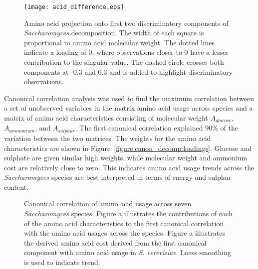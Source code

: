 \begin{figure}
  \centering
  \texttt{[image: acid\_difference.eps]}
  \caption[Amino acid projection onto first two discriminatory components of \emph{Saccharomyces} decomposition]{Amino acid projection onto first two discriminatory components of \emph{Saccharomyces} decomposition. The width of each square is proportional to amino acid molecular weight. The dotted lines indicate a loading of 0, where observations closer to 0 have a lesser contribution to the singular value. The dashed circle crosses both components at -0.3 and 0.3 and is added to highlight discriminatory observations.}
  \label{figure:acid_decomp}
\end{figure}

Canonical correlation analysis was used to find the maximum correlation between a set of unobserved variables in the matrix amino acid usage across species and a matrix of amino acid characteristics consisting of molecular weight $A_{glucose}$, $A_{ammonium}$, and $A_{sulphur}$. The first canonical correlation explained 90\% of the variation between the two matrices. The weights for the amino acid characteristics are shown in Figure~\vref{figure:canon_decomp:loadings}. Glucose and sulphate are given similar high weights, while molecular weight and ammonium cost are relatively close to zero. This indicates amino acid usage trends across the \emph{Saccharomyces} species are best interpreted in terms of energy and sulphur content.


\begin{figure}
  \centering
  \vfill
  \caption[Canonical correlation of amino acid usage]{Canonical correlation of amino acid usage across seven \emph{Saccharomyces} species. Figure a illustrates the contributions of each of the amino acid characteristics to the first canonical correlation with the amino acid usages across the species. Figure a illustrates the derived amino acid cost derived from the first canonical component with amino acid usage in \emph{S. cerevisiae}. Loess smoothing is used to indicate trend.}
  \label{figure:canon_decomp}
\end{figure}

